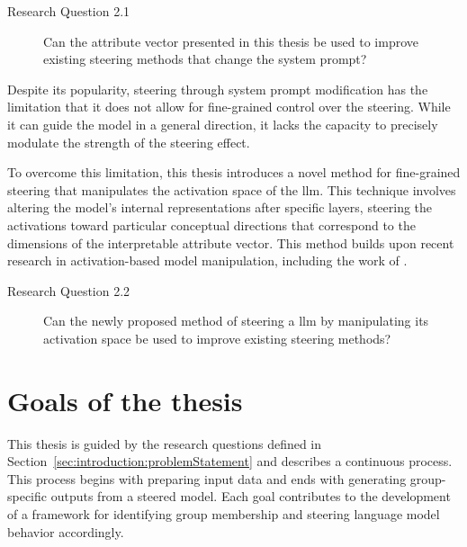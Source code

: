 \begin{description}
  \item[Research Question 2.1] Can the attribute vector presented in this thesis be used to improve existing steering methods that change the system prompt?
\end{description}

Despite its popularity, steering through system prompt modification has the limitation that it does not allow for fine-grained control over the steering. While it can guide the model in a general direction, it lacks the capacity to precisely modulate the strength of the steering effect.

To overcome this limitation, this thesis introduces a novel method for fine-grained steering that manipulates the activation space of the \ac{llm}. This technique involves altering the model's internal representations after specific layers, steering the activations toward particular conceptual directions that correspond to the dimensions of the interpretable attribute vector. This method builds upon recent research in activation-based model manipulation, including the work of \citet{konenStyleVectorsSteering2024,turnerActivationAdditionSteering2024,rimsky-etal-2024-steering}.

\begin{description}
  \item[Research Question 2.2] Can the newly proposed method of steering a \ac{llm} by manipulating its activation space be used to improve existing steering methods?
\end{description}


\section{Goals of the thesis}
\label{sec:introduction:goals}
\newlength{\maxstretch}
\setlength{\maxstretch}{0pt plus 1fill}
This thesis is guided by the research questions defined in Section~\ref{sec:introduction:problemStatement} and describes a continuous process. This process begins with preparing input data and ends with generating group-specific outputs from a steered model. Each goal contributes to the development of a framework for identifying group membership and steering language model behavior accordingly.

